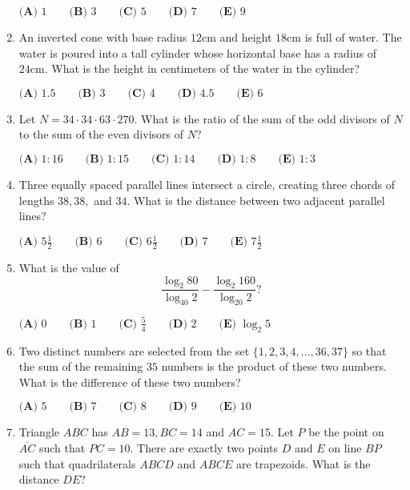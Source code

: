 \documentclass{article}
\begin{document}
\begin{enumerate}[label=\arabic*., itemsep=0.5em]
$\textbf{(A) }1 \qquad \textbf{(B) }3 \qquad \textbf{(C) }5 \qquad \textbf{(D) }7 \qquad \textbf{(E) }9$\par \vspace{0.5em}\item An inverted cone with base radius $12 \text{cm}$ and height $18\text{cm}$ is full of water. The water is poured into a tall cylinder whose horizontal base has a radius of $24\text{cm}$. What is the height in centimeters of the water in the cylinder?

$\textbf{(A) }1.5 \qquad \textbf{(B) }3 \qquad \textbf{(C) }4 \qquad \textbf{(D) }4.5 \qquad \textbf{(E) }6$\par \vspace{0.5em}\item Let $N=34\cdot34\cdot63\cdot270.$ What is the ratio of the sum of the odd divisors of $N$ to the sum of the even divisors of $N?$

$\textbf{(A) }1:16 \qquad \textbf{(B) }1:15 \qquad \textbf{(C) }1:14 \qquad \textbf{(D) }1:8 \qquad \textbf{(E) }1:3$\par \vspace{0.5em}\item Three equally spaced parallel lines intersect a circle, creating three chords of lengths $38,38,$ and $34$. What is the distance between two adjacent parallel lines?

$\textbf{(A) }5\frac12 \qquad \textbf{(B) }6 \qquad \textbf{(C) }6\frac12 \qquad \textbf{(D) }7 \qquad \textbf{(E) }7\frac12$\par \vspace{0.5em}\item What is the value of
\begin{equation*}
\frac{\log_2 80}{\log_{40}2}-\frac{\log_2 160}{\log_{20}2}?
\end{equation*}

$\textbf{(A) }0 \qquad \textbf{(B) }1 \qquad \textbf{(C) }\frac54 \qquad \textbf{(D) }2 \qquad \textbf{(E) }\log_2 5$\par \vspace{0.5em}\item Two distinct numbers are selected from the set $\{1,2,3,4,\dots,36,37\}$ so that the sum of the remaining $35$ numbers is the product of these two numbers. What is the difference of these two numbers?

$\textbf{(A) }5 \qquad \textbf{(B) }7 \qquad \textbf{(C) }8\qquad \textbf{(D) }9 \qquad \textbf{(E) }10$\par \vspace{0.5em}\item Triangle $ABC$ has $AB=13,BC=14$ and $AC=15$. Let $P$ be the point on $\overline{AC}$ such that $PC=10$. There are exactly two points $D$ and $E$ on line $BP$ such that quadrilaterals $ABCD$ and $ABCE$ are trapezoids. What is the distance $DE?$


\end{enumerate}
\end{document}
